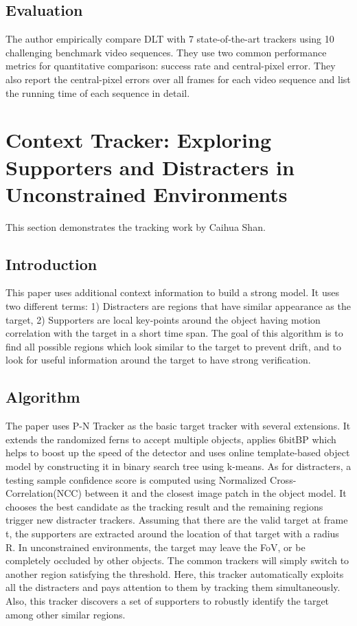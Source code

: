 \documentclass{article}
\begin{document}
\subsection{Evaluation}

The author empirically compare DLT with 7 state-of-the-art trackers using 10 challenging benchmark video sequences. They use two common performance metrics for quantitative comparison: success rate and central-pixel error. They also report the central-pixel errors over all frames for each video sequence and list the running time of each sequence in detail.


\section{Context Tracker: Exploring Supporters and Distracters in Unconstrained Environments}
This section demonstrates the tracking work by Caihua Shan.

\subsection{Introduction}
    This paper uses additional context information to build a strong model. It uses two different terms: 1) Distracters are regions that have similar appearance as the target, 2) Supporters are local key-points around the object having motion correlation with the target in a short time span. The goal of this algorithm is to find all possible regions which look similar to the target to prevent drift, and to look for useful information around the target to have strong verification.
    
\subsection{Algorithm}
    The paper uses P-N Tracker as the basic target tracker with several extensions. It extends the randomized ferns to accept multiple objects, applies 6bitBP which helps to boost up the speed of the detector and uses online template-based object model by constructing it in binary search tree using k-means.
    \newline
    As for distracters, a testing sample confidence score is computed using Normalized Cross-Correlation(NCC) between it and the closest image patch in the object model. It chooses the best candidate as the tracking result and the remaining regions trigger new distracter trackers.
    \newline
    Assuming that there are the valid target at frame t, the supporters are extracted around the location of that target with a radius R.
    \newline
    In unconstrained environments, the target may leave the FoV, or be completely occluded by other objects. The common trackers will simply switch to another region satisfying the threshold. Here, this tracker automatically exploits all the distracters and pays attention to them by tracking them simultaneously. Also, this tracker discovers a set of supporters to robustly identify the target among other similar regions.
\end{document}
